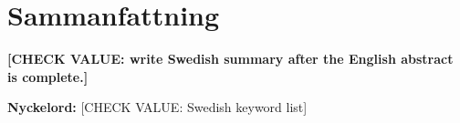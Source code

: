 \section*{Sammanfattning}\label{sec:sammanfattning}

\textbf{[CHECK VALUE: write Swedish summary after the English abstract is complete.]}

\textbf{Nyckelord:} [CHECK VALUE: Swedish keyword list]
